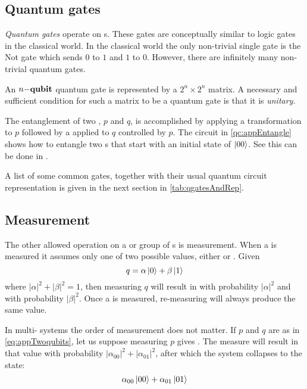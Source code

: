 
\subsection{Quantum gates} %
\label{sub:quantum_gates}

\emph{Quantum gates} operate on \qubit{}s. These gates are conceptually similar to logic gates in
the classical world. In the classical world the only non-trivial single \bit{} gate is the Not gate
which sends $0$ to $1$ and $1$ to $0$. However, there are infinitely many non-trivial quantum gates.

An $n{-}\mathbf{{qubit}}{}$ quantum gate is represented by a $2^n \times 2^n$ matrix. A necessary and
sufficient condition for such a matrix to be a quantum gate is that it is \emph{unitary}.

The entanglement of two \qubits{}, $p$ and $q$, is accomplished by applying a \Had{} transformation
to $p$ followed by a \nottr{} applied to $q$ controlled by $p$. The circuit in
\vref{qc:appEntangle} shows how to entangle two \qubit{}s that start with an initial state of
$\left\vert{00}\right\rangle$. See %
this can be done in \lqpl.

A list of some common gates, together with their usual quantum circuit representation is given in
the next section in \vref{tab:qgatesAndRep}.

\subsection{Measurement} %
\label{sub:measuerment}

The other allowed operation on a \qubit{} or group of \qubit{}s is measurement. When a \qubit{} is
measured it assumes only one of two possible values, either  or . Given
\begin{equation} q=\alpha\left\vert{0}\right\rangle+\beta\left\vert{1}\right\rangle\label{eq:appSinglequbit} \end{equation} where
$|\alpha|^2+|\beta|^2 = 1$, then measuring $q$ will result in  with probability $|\alpha|^2$
and  with probability $|\beta|^2$. Once a \qubit{} is measured, re-measuring will always
produce the same value.

In multi-\qubit{} systems the order of measurement does not matter. If $p$ and $q$ are as in
\vref{eq:appTwoqubits}, let us suppose measuring $p$ gives . The measure will result in that
value with probability $|\alpha_{00}|^2 + |\alpha_{01}|^2$, after which the system collapses to the
state:
\begin{equation}
  \alpha_{00}\left\vert{00}\right\rangle + \alpha_{01}\left\vert{01}\right\rangle\label{eq:appCollapsedFirstBit}
\end{equation}

